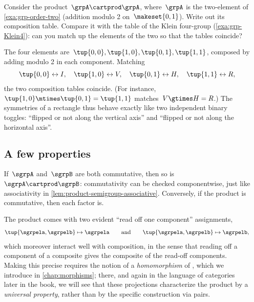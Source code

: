 \begin{exercise}
    \label{ex:Klein-as-product}
    Consider the product~$\grpA \cartprod \grpA$, where~$\grpA$ is the two-element  of \cref{exa:grp-order-two} (addition modulo 2 on~$\makeset{0,1}$).
    Write out its composition table.
    Compare it with the table of the Klein four-group (\cref{exa:grp-Klein4}): can you match up the elements of the two  so that the tables coincide?
\end{exercise}
\begin{solution}
    The four elements are~$\tup{0,0}, \tup{1,0}, \tup{0,1}, \tup{1,1}$, composed by adding modulo 2 in each component.
    Matching
    \begin{equation}
        \tup{0,0} \leftrightarrow I, \quad
        \tup{1,0} \leftrightarrow V, \quad
        \tup{0,1} \leftrightarrow H, \quad
        \tup{1,1} \leftrightarrow R,
    \end{equation}
    the two composition tables coincide.
    (For instance, $\tup{1,0} \mtimes \tup{0,1} = \tup{1,1}$ matches~$V \gtimes H = R$.)
    The symmetries of a rectangle thus behave exactly like two independent binary toggles: ``flipped or not along the vertical axis'' and ``flipped or not along the horizontal axis''.
\end{solution}

\subsection{A few properties}

\begin{remark}
    If~$\sgrpA$ and~$\sgrpB$ are both commutative, then so is~$\sgrpA \cartprod \sgrpB$: commutativity can be checked componentwise, just like associativity in \cref{lem:product-semigroup-associative}.
    Conversely, if the product is commutative, then each factor is.
\end{remark}

\begin{remark}
    \label{rem:product-projections-forward}
    The product comes with two evident ``read off one component'' assignments,
    \begin{equation}
        \tup{\sgrpela, \sgrpelb} \mapsto \sgrpela
        \qquad \text{and} \qquad
        \tup{\sgrpela, \sgrpelb} \mapsto \sgrpelb,
    \end{equation}
    which moreover interact well with composition, in the sense that reading off a component of a composite gives the composite of the read-off components.
    Making this precise requires the notion of a \emph{homomorphism} of , which we introduce in \cref{chap:morphisms}; there, and again in the language of categories later in the book, we will see that these projections characterize the product by a \emph{universal property}, rather than by the specific construction via pairs.
\end{remark}
